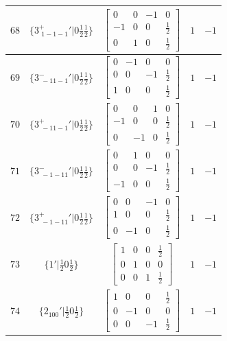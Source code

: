 \documentclass[fleqn,8pt]{jsarticle}
\begin{document}
\begin{longtable}{ccccc}
$ 68 $ & $ \{3^{+}_{\,\,1-1-1}{}'|0 \frac{1}{2} \frac{1}{2}\} $ & $ \begin{bmatrix} 0 & 0 & -1 & 0 \\ -1 & 0 & 0 & \frac{1}{2} \\ 0 & 1 & 0 & \frac{1}{2} \end{bmatrix} $ & $ 1 $ & $ -1 $ \\ \hline
$ 69 $ & $ \{3^{-}_{\,\,-11-1}{}'|0 \frac{1}{2} \frac{1}{2}\} $ & $ \begin{bmatrix} 0 & -1 & 0 & 0 \\ 0 & 0 & -1 & \frac{1}{2} \\ 1 & 0 & 0 & \frac{1}{2} \end{bmatrix} $ & $ 1 $ & $ -1 $ \\ \hline
$ 70 $ & $ \{3^{+}_{\,\,-11-1}{}'|0 \frac{1}{2} \frac{1}{2}\} $ & $ \begin{bmatrix} 0 & 0 & 1 & 0 \\ -1 & 0 & 0 & \frac{1}{2} \\ 0 & -1 & 0 & \frac{1}{2} \end{bmatrix} $ & $ 1 $ & $ -1 $ \\ \hline
$ 71 $ & $ \{3^{-}_{\,\,-1-11}{}'|0 \frac{1}{2} \frac{1}{2}\} $ & $ \begin{bmatrix} 0 & 1 & 0 & 0 \\ 0 & 0 & -1 & \frac{1}{2} \\ -1 & 0 & 0 & \frac{1}{2} \end{bmatrix} $ & $ 1 $ & $ -1 $ \\ \hline
$ 72 $ & $ \{3^{+}_{\,\,-1-11}{}'|0 \frac{1}{2} \frac{1}{2}\} $ & $ \begin{bmatrix} 0 & 0 & -1 & 0 \\ 1 & 0 & 0 & \frac{1}{2} \\ 0 & -1 & 0 & \frac{1}{2} \end{bmatrix} $ & $ 1 $ & $ -1 $ \\ \hline
$ 73 $ & $ \{1{}'|\frac{1}{2} 0 \frac{1}{2}\} $ & $ \begin{bmatrix} 1 & 0 & 0 & \frac{1}{2} \\ 0 & 1 & 0 & 0 \\ 0 & 0 & 1 & \frac{1}{2} \end{bmatrix} $ & $ 1 $ & $ -1 $ \\ \hline
$ 74 $ & $ \{2{}_{100}{}'|\frac{1}{2} 0 \frac{1}{2}\} $ & $ \begin{bmatrix} 1 & 0 & 0 & \frac{1}{2} \\ 0 & -1 & 0 & 0 \\ 0 & 0 & -1 & \frac{1}{2} \end{bmatrix} $ & $ 1 $ & $ -1 $ \\ \hline

\end{longtable}
\end{document}
